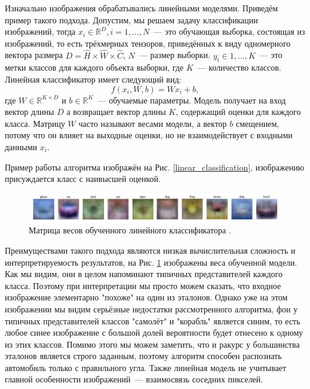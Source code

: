 \documentclass[12pt, fleqn]{article}
\begin{document}
    Изначально изображения обрабатывались линейными моделями. Приведём пример такого подхода. Допустим, мы решаем задачу 
    классификации изображений, тогда $x_i \in \mathbb{R}^D, i = 1, \dots, N$~--- это обучающая выборка, состоящая из 
    изображений, то есть трёхмерных тензоров, приведённых к виду одномерного вектора размера $D = \hat{H} \times \hat{W} \times \hat{C}$, 
    $N$~--- размер выборки. $y_i \in 1, \dots, K$~--- это метки классов для каждого объекта выборки, где $K$~--- количество классов. 
    Линейная классификатор имеет следующий вид:
    $$f(x_i ,W , b) = W x_i + b,$$ 
    \noindent где $W \in \mathbb{R}^{K \times D}$ и $b\in \mathbb{R}^K$~--- обучаемые параметры. 
    Модель получает на вход вектор длины $D$ а возвращает вектор длины $K$, содержащий оценки для каждого класса. 
    Матрицу $W$ часто называют весами модели, а вектор $b$ смещением, потому 
    что он влияет на выходные оценки, но не взаимодействует с входными данными $x_i$. 
    
    Пример работы алгоритма изображён на Рис. \ref{linear_classification}, изображению присуждается класс с наивысшей оценкой.

    \begin{figure}[ht]
        \centering
        \includegraphics[scale=0.5]{pics/linear_weights.png}
        \caption{Матрица весов обученного линейного классификатора \cite{cs231n}.}
        \label{linear_weights}
    \end{figure}

    Преимуществами такого подхода являются низкая вычислительная сложность и интерпретируемость результатов, на Рис. \ref{linear_weights} 
    изображены веса обученной модели. Как мы видим, они в целом напоминают типичных представителей каждого класса. Поэтому при интерпретации 
    мы просто можем сказать, что входное изображение элементарно "похоже" на один из эталонов. Однако уже на этом изображении мы видим 
    серьёзные недостатки рассмотренного алгоритма, фон у типичных представителей классов "самолёт" и "корабль" является синим, то есть 
    любое синее изображение с большой долей вероятности будет отнесено к одному из этих классов. Помимо этого мы можем заметить, что и ракурс 
    у большинства эталонов является строго заданным, поэтому алгоритм способен распознать автомобиль только с правильного угла. Также 
    линейная модель не учитывает главной особенности изображений~--- взаимосвязь соседних пикселей. 
    
\end{document}
